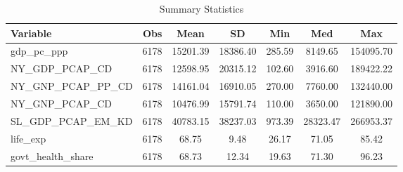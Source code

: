 \begin{table}
\centering
\caption{Summary Statistics}
\label{Sum_Stats}
\begin{tabular}{lcccccc}
\toprule
         Variable &  Obs &     Mean &       SD &    Min &      Med &       Max \\
\midrule
gdp\_pc\_ppp & 6178 & 15201.39 & 18386.40 & 285.59 & 8149.65 & 154095.70 \\
NY\_GDP\_PCAP\_CD & 6178 & 12598.95 & 20315.12 & 102.60 & 3916.60 & 189422.22 \\
NY\_GNP\_PCAP\_PP\_CD & 6178 & 14161.04 & 16910.05 & 270.00 & 7760.00 & 132440.00 \\
NY\_GNP\_PCAP\_CD & 6178 & 10476.99 & 15791.74 & 110.00 & 3650.00 & 121890.00 \\
SL\_GDP\_PCAP\_EM\_KD & 6178 & 40783.15 & 38237.03 & 973.39 & 28323.47 & 266953.37 \\
life\_exp & 6178 & 68.75 & 9.48 & 26.17 & 71.05 & 85.42 \\
govt\_health\_share & 6178 & 68.73 & 12.34 & 19.63 & 71.30 & 96.23 \\
\bottomrule
\end{tabular}
\end{table}
